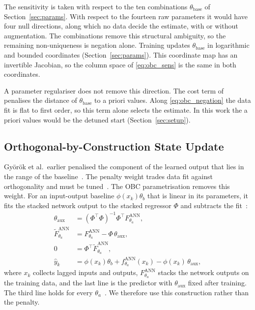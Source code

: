 The sensitivity is taken with respect to the ten combinations
$\theta_{\mathrm{base}}$ of Section~\ref{sec:params}.
With respect to the fourteen raw parameters it would have four null
directions, along which no data decide the estimate, with or without
augmentation.
The combinations remove this structural ambiguity, so the remaining
non-uniqueness is negation alone.
Training updates $\theta_{\mathrm{base}}$ in logarithmic and bounded
coordinates (Section~\ref{sec:params}).
This coordinate map has an invertible Jacobian, so the column space of
\eqref{eq:obc_sens} is the same in both coordinates.

A parameter regulariser does not remove this direction.
The cost term of~\cite[Sec.~5.2, Eq.~(26)]{hoekstra2026lfr} penalises the
distance of $\theta_{\mathrm{base}}$ to a priori values.
Along \eqref{eq:obc_negation} the data fit is flat to first order, so this
term alone selects the estimate.
In this work the a priori values would be the detuned start
(Section~\ref{sec:setup}).

\subsection{Orthogonal-by-Construction State Update}\label{sec:obc_map}
Gy\"or\"ok et al.\ earlier penalised the component of the learned output that
lies in the range of the baseline~\cite[Eq.~(13)]{gyorok2025l4dc}.
The penalty weight trades data fit against orthogonality and must be
tuned~\cite[Sec.~1]{gyorok2026obc}.
The OBC parametrisation removes this weight.
For an input-output baseline $\phi(x_k)\theta_b$ that is linear in its
parameters, it fits the stacked network output to the stacked regressor $\Phi$
and subtracts the fit~\cite[Eqs.~(8), (10), (11), (13)]{gyorok2026obc}:
\begin{equation}
\begin{aligned}
 \theta_{\mathrm{aux}}&=(\Phi^\top\Phi)^{-1}\Phi^\top F^{\mathrm{ANN}}_{\theta_a},\\
 \widetilde F^{\mathrm{ANN}}_{\theta_a}&=F^{\mathrm{ANN}}_{\theta_a}-\Phi\,\theta_{\mathrm{aux}},\\
 0&=\Phi^\top\widetilde F^{\mathrm{ANN}}_{\theta_a},\\
 \hat y_k&=\phi(x_k)\theta_b+f^{\mathrm{ANN}}_{\theta_a}(x_k)-\phi(x_k)\,\theta_{\mathrm{aux}},
\end{aligned}
\label{eq:obc_gyorok}
\end{equation}
where $x_k$ collects lagged inputs and outputs, $F^{\mathrm{ANN}}_{\theta_a}$
stacks the network outputs on the training data, and the last line is the
predictor with $\theta_{\mathrm{aux}}$ fixed after training.
The third line holds for every $\theta_a$~\cite[Lemma~3]{gyorok2026obc}.
We therefore use this construction rather than the penalty.

